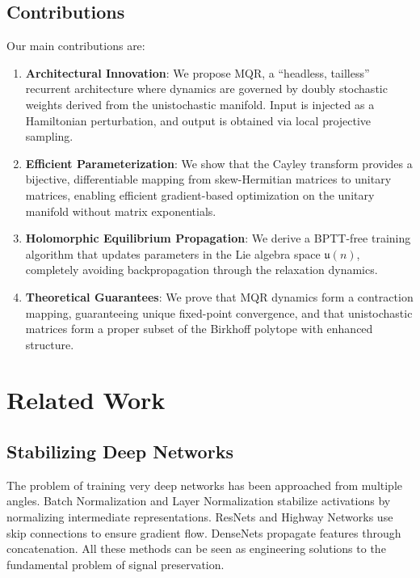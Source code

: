 \documentclass[11pt,a4paper]{article}
\begin{document}
\subsection{Contributions}

Our main contributions are:
\begin{enumerate}[leftmargin=*]
    \item \textbf{Architectural Innovation}: We propose MQR, a ``headless, tailless'' recurrent architecture where dynamics are governed by doubly stochastic weights derived from the unistochastic manifold. Input is injected as a Hamiltonian perturbation, and output is obtained via local projective sampling.
    
    \item \textbf{Efficient Parameterization}: We show that the Cayley transform provides a bijective, differentiable mapping from skew-Hermitian matrices to unitary matrices, enabling efficient gradient-based optimization on the unitary manifold without matrix exponentials.
    
    \item \textbf{Holomorphic Equilibrium Propagation}: We derive a BPTT-free training algorithm that updates parameters in the Lie algebra space $\mathfrak{u}(n)$, completely avoiding backpropagation through the relaxation dynamics.
    
    \item \textbf{Theoretical Guarantees}: We prove that MQR dynamics form a contraction mapping, guaranteeing unique fixed-point convergence, and that unistochastic matrices form a proper subset of the Birkhoff polytope with enhanced structure.
\end{enumerate}

\section{Related Work}
\label{sec:related}

\subsection{Stabilizing Deep Networks}

The problem of training very deep networks has been approached from multiple angles. Batch Normalization \citep{ioffe2015batch} and Layer Normalization \citep{ba2016layer} stabilize activations by normalizing intermediate representations. ResNets \citep{he2016deep} and Highway Networks \citep{srivastava2015highway} use skip connections to ensure gradient flow. DenseNets \citep{huang2017densely} propagate features through concatenation. All these methods can be seen as engineering solutions to the fundamental problem of signal preservation.
\end{document}
